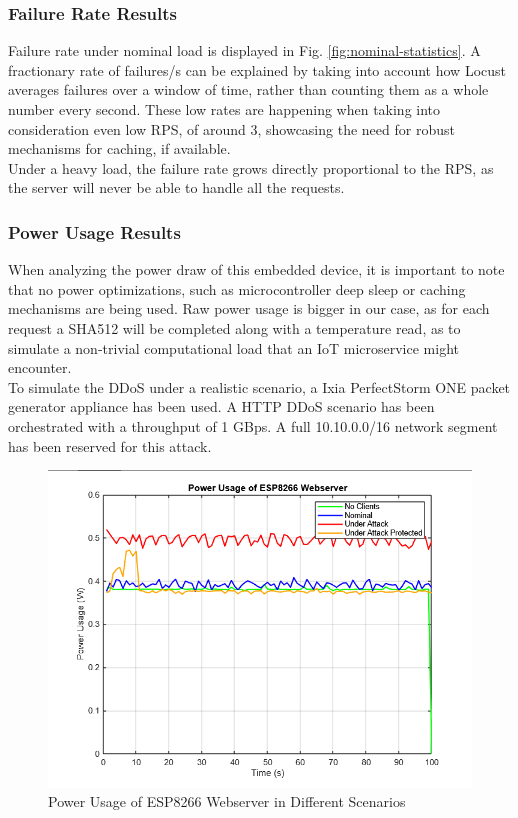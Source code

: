 \documentclass[conference]{IEEEtran}
\begin{document}
\subsubsection*{Failure Rate Results}
Failure rate under nominal load is displayed in Fig. \ref{fig:nominal-statistics}. A fractionary rate of failures/s can be explained by taking into account how Locust averages failures over a window of time, rather than counting them as a whole number every second. These low rates are happening when taking into consideration even low RPS, of around 3, showcasing the need for robust mechanisms for caching, if available.
\\
Under a heavy load, the failure rate grows directly proportional to the RPS, as the server will never be able to handle all the requests.

\subsubsection*{Power Usage Results}

When analyzing the power draw of this embedded device, it is important to note that no power optimizations, such as microcontroller deep sleep or caching mechanisms are being used. Raw power usage is bigger in our case, as for each request a SHA512 will be completed along with a temperature read, as to simulate a non-trivial computational load that an IoT microservice might encounter.
\\
To simulate the DDoS under a realistic scenario, a Ixia PerfectStorm ONE packet generator appliance has been used. A HTTP DDoS scenario has been orchestrated with a throughput of 1 GBps. A full 10.10.0.0/16 network segment has been reserved for this attack.

\begin{figure}
    \centering
    \includegraphics[width=1\linewidth]{images/power_usage_esp8266.png}
    \caption{Power Usage of ESP8266 Webserver in Different Scenarios}
    \label{fig:power-usage}
\end{figure}
\end{document}
